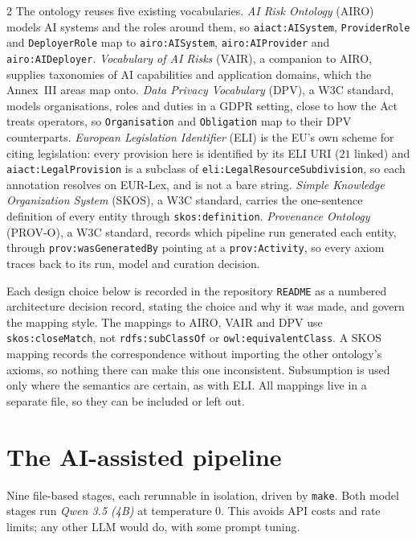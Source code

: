 \documentclass[10pt,a4paper]{article}
\begin{document}
\begin{multicols}{2}
The ontology reuses five existing vocabularies.
\emph{AI Risk Ontology} (AIRO) models AI systems and the roles around them, so \texttt{aiact:AISystem}, \texttt{ProviderRole} and \texttt{DeployerRole} map to \texttt{airo:AISystem}, \texttt{airo:AIProvider} and \texttt{airo:AIDeployer}.
\emph{Vocabulary of AI Risks} (VAIR), a companion to AIRO, supplies taxonomies of AI capabilities and application domains, which the Annex~III areas map onto.
\emph{Data Privacy Vocabulary} (DPV), a W3C standard, models organisations, roles and duties in a GDPR setting, close to how the Act treats operators, so \texttt{Organisation} and \texttt{Obligation} map to their DPV counterparts.
\emph{European Legislation Identifier} (ELI) is the EU's own scheme for citing legislation: every provision here is identified by its ELI URI ($21$ linked) and \texttt{aiact:LegalProvision} is a subclass of \texttt{eli:LegalResourceSubdivision}, so each annotation resolves on EUR-Lex, and is not a bare string.
\emph{Simple Knowledge Organization System} (SKOS), a W3C standard, carries the one-sentence definition of every entity through \texttt{skos:definition}.
\emph{Provenance Ontology} (PROV-O), a W3C standard, records which pipeline run generated each entity, through \texttt{prov:wasGeneratedBy} pointing at a \texttt{prov:Activity}, so every axiom traces back to its run, model and curation decision.

Each design choice below is recorded in the repository \texttt{README} as a numbered architecture decision record, stating the choice and why it was made, and govern the mapping style.
The mappings to AIRO, VAIR and DPV use \texttt{skos:closeMatch}, not \texttt{rdfs:subClassOf} or \texttt{owl:equivalentClass}.
A SKOS mapping records the correspondence without importing the other ontology's axioms, so nothing there can make this one inconsistent.
Subsumption is used only where the semantics are certain, as with ELI.
All mappings live in a separate file, so they can be included or left out.

\section{The AI-assisted pipeline}

Nine file-based stages, each rerunnable in isolation, driven by \texttt{make}. 
Both model stages run \emph{Qwen 3.5 (4B)} at temperature $0$.
This avoids API costs and rate limits; any other LLM would do, with some prompt tuning.


\end{multicols}
\end{document}
